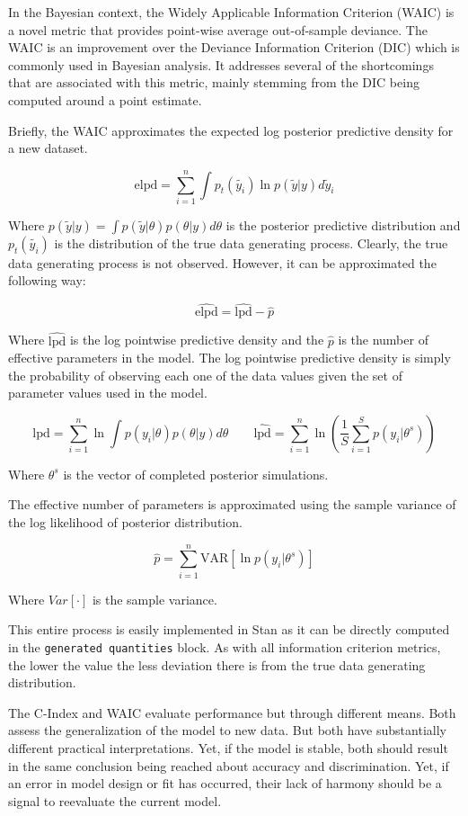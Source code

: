 In the Bayesian context, the Widely Applicable Information Criterion (WAIC) is a novel metric that provides point-wise average out-of-sample deviance\cite{Watanabe2010}. The WAIC is an improvement over the Deviance Information Criterion (DIC) which is commonly used in Bayesian analysis. It addresses several of the shortcomings that are associated with this metric, mainly stemming from the DIC being computed around a point estimate. 

Briefly, the WAIC approximates the expected log posterior predictive density for a new dataset\cite{Vehtari2015}. 

$$ \text{elpd} = \sum_{i=1}^n \int p_t(\tilde{y_i})\ln p(\tilde{y}|y) d\tilde{y}_i $$

Where $p(\tilde{y}|y) = \int p(\tilde{y}|\theta)p(\theta|y) d\theta$ is the posterior predictive distribution and $p_t(\tilde{y_i})$ is the distribution of the true data generating process. Clearly, the true data generating process is not observed. However, it can be approximated the following way:

$$\hat{\text{elpd}} = \hat{\text{lpd}} - \hat{p}$$

Where $\hat{\text{lpd}}$ is the log pointwise predictive density and the $\hat{p}$ is the number of effective parameters in the model. The log pointwise predictive density is simply the probability of observing each one of the data values given the set of parameter values used in the model.

$$ \text{lpd} = \sum_{i=1}^n \ln \int p(y_i|\theta)p(\theta|y) d\theta \qquad \hat{\text{lpd}} = \sum_{i=1}^n \ln\left ( \frac{1}{S} \sum_{i = 1}^S p(y_i|\theta^s)  \right ) $$

Where $\theta^s$ is the vector of completed posterior simulations. 

The effective number of parameters is approximated using the sample variance of the log likelihood of posterior distribution.

$$ \hat{p} = \sum^n_{i=1} \text{VAR}[\ln p(y_i|\theta^s)] $$

Where $Var[\cdot]$ is the sample variance.

This entire process is easily implemented in Stan as it can be directly computed in the \lstinline{generated quantities} block\cite{Vehtari2014}. As with all information criterion metrics, the lower the value the less deviation there is from the true data generating distribution. 

The C-Index and WAIC evaluate performance but through different means. Both assess the generalization of the model to new data. But both have substantially different practical interpretations. Yet, if the model is stable, both should result in the same conclusion being reached about accuracy and discrimination. Yet, if an error in model design or fit has occurred, their lack of harmony should be a signal to reevaluate the current model. 



